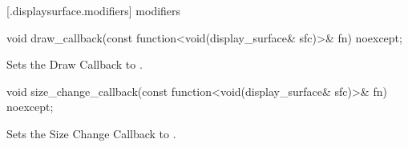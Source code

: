  [\iotwod.displaysurface.modifiers]{ modifiers}

\begin{itemdecl}
void draw_callback(const function<void(display_surface& sfc)>& fn) noexcept;
\end{itemdecl}
\begin{itemdescr}
\pnum
\effects
Sets the Draw Callback to .
\end{itemdescr}

\begin{itemdecl}
void size_change_callback(const function<void(display_surface& sfc)>& fn)
  noexcept;
\end{itemdecl}
\begin{itemdescr}
\pnum
\effects
Sets the Size Change Callback to .
\end{itemdescr}

